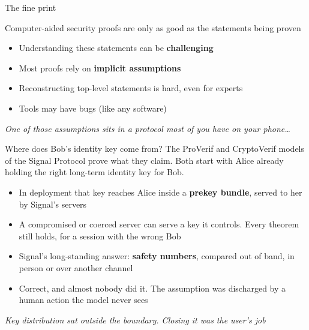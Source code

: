 \ifdefined\PRESENTATION\else\PassOptionsToClass{handout}{beamer}\fi\documentclass[aspectratio=169, lualatex]{beamer}
\begin{document}
\begin{frame}{The fine print}
	\begin{center}
		\Large
		Computer-aided security proofs are only as good as the statements being proven
	\end{center}
	\vspace{1em}
	\begin{itemize}
		\item Understanding these statements can be \textbf{challenging}
		\item Most proofs rely on \textbf{implicit assumptions}
		\item Reconstructing top-level statements is hard, even for experts
		\item Tools may have bugs (like any software)
	\end{itemize}
	\vspace{0.5em}
	\begin{center}
		\textit{One of those assumptions sits in a protocol most of you have on your phone\ldots}
	\end{center}
\end{frame}

\begin{frame}{Where does Bob's identity key come from?}
	The ProVerif and CryptoVerif models of the Signal Protocol prove what they claim. Both start with Alice already holding the right long-term identity key for Bob.
	\vspace{0.5em}
	\begin{itemize}
		\item In deployment that key reaches Alice inside a \textbf{prekey bundle}, served to her by Signal's servers
		\item A compromised or coerced server can serve a key it controls. Every theorem still holds, for a session with the wrong Bob
		\item Signal's long-standing answer: \textbf{safety numbers}, compared out of band, in person or over another channel
		\item Correct, and almost nobody did it. The assumption was discharged by a human action the model never sees
	\end{itemize}
	\vspace{0.5em}
	\begin{center}
		\textit{Key distribution sat outside the boundary. Closing it was the user's job}
	\end{center}
\end{frame}
\end{document}
